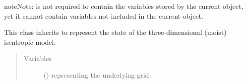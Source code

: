 \documentclass[letterpaper,10pt,english]{sphinxmanual}
\begin{document}
\begin{fulllineitems}
\begin{fulllineitems}
\begin{quote}
\begin{description}
\end{description}\end{quote}

\begin{sphinxadmonition}{note}{Note:}
 is not required to contain  the variables stored by the current object, yet it cannot contain
variables not included in the current object.
\end{sphinxadmonition}

\end{fulllineitems}


\end{fulllineitems}


\begin{fulllineitems}
\label{\detokenize{api:storages.state_isentropic.StateIsentropic}}
This class inherits {\hyperref[\detokenize{api:storages.grid_data.GridData}]{}} to represent the state of the three-dimensional
(moist) isentropic model.
\begin{quote}\begin{description}
\item[{Variables}] \leavevmode
{} () \textendash{} {\hyperref[\detokenize{api:grids.grid_xyz.GridXYZ}]{}} representing the underlying grid.

\end{description}\end{quote}


\end{fulllineitems}
\end{document}
